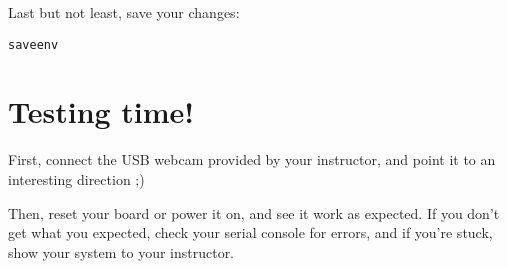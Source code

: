 Last but not least, save your changes:
\begin{verbatim}
saveenv
\end{verbatim}

\section{Testing time!}

First, connect the USB webcam provided by your instructor, and point it
to an interesting direction ;)

Then, reset your board or power it on, and see it work as expected. If
you don't get what you expected, check your serial console for errors,
and if you're stuck, show your system to your instructor.
